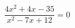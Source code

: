 \begin{ex}[type=equation]
	\begin{condition}
		\( \dfrac{4x^2+4x-35}{x^2-7x+12}=0 \)
	\end{condition}
\end{ex}